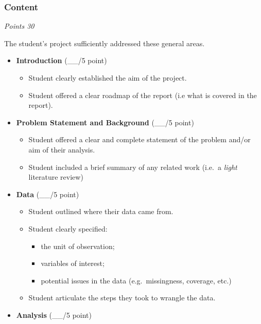 \documentclass[
  11pt,
]{article}
\providecommand{\tightlist}{%
  \setlength{\itemsep}{0pt}\setlength{\parskip}{0pt}}
\begin{document}
\hypertarget{content}{%
\subsubsection{Content}\label{content}}

\emph{Points 30}

The student's project sufficiently addressed these general areas.

\begin{itemize}
\item
  \textbf{Introduction} (\_\_/5 point)

  \begin{itemize}
  \item
    Student clearly established the aim of the project.
  \item
    Student offered a clear roadmap of the report (i.e what is covered
    in the report).
  \end{itemize}
\item
  \textbf{Problem Statement and Background} (\_\_/5 point)

  \begin{itemize}
  \item
    Student offered a clear and complete statement of the problem and/or
    aim of their analysis.
  \item
    Student included a brief summary of any related work (i.e.~a
    \emph{light} literature review)
  \end{itemize}
\item
  \textbf{Data} (\_\_/5 point)

  \begin{itemize}
  \item
    Student outlined where their data came from.
  \item
    Student clearly specified:

    \begin{itemize}
    \tightlist
    \item
      the unit of observation;
    \item
      variables of interest;
    \item
      potential issues in the data (e.g.~missingness, coverage, etc.)
    \end{itemize}
  \item
    Student articulate the steps they took to wrangle the data.
  \end{itemize}
\item
  \textbf{Analysis} (\_\_/5 point)


\end{itemize}
\end{document}
